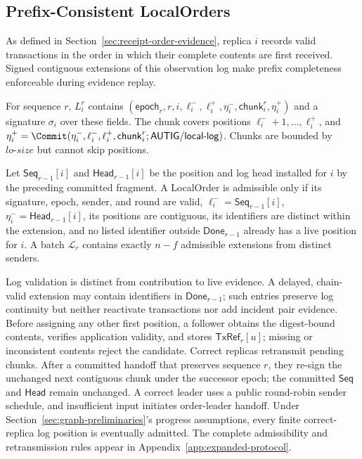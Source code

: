 \subsection{Prefix-Consistent LocalOrders}
\label{sec:prefix-consistent-localorders}

As defined in Section~\ref{sec:receipt-order-evidence}, replica $i$ records
valid transactions in the order in which their complete contents are first
received.  Signed contiguous extensions of this observation log make prefix
completeness enforceable during evidence replay.

For sequence $r$, $L_i^r$ contains
$(\mathsf{epoch}_r,r,i,\ell_i^{-},\ell_i^{+},\eta_i^{-},
\mathsf{chunk}_i^r,\eta_i^{+})$ and a signature $\sigma_i$ over these fields.
The chunk covers positions $\ell_i^{-}+1,\ldots,\ell_i^{+}$, and
$\eta_i^{+}=\Commit(\eta_i^{-},\ell_i^{-},\ell_i^{+},
\mathsf{chunk}_i^r;\mathsf{AUTIG/local\mbox{-}log})$.
Chunks are bounded by $lo\text{-}size$ but cannot skip positions.

Let $\mathsf{Seq}_{r-1}[i]$ and $\mathsf{Head}_{r-1}[i]$ be the position and
log head installed for $i$ by the preceding committed fragment.
A LocalOrder is admissible only if its signature, epoch, sender, and round are
valid,
$\ell_i^{-}=\mathsf{Seq}_{r-1}[i]$,
$\eta_i^{-}=\mathsf{Head}_{r-1}[i]$, its positions are contiguous, its
identifiers are distinct within the extension, and no listed identifier
outside $\mathsf{Done}_{r-1}$ already has a live position for $i$.  A batch
$\mathcal L_r$ contains exactly $n-f$ admissible extensions from distinct
senders.

Log validation is distinct from contribution to live evidence.  A delayed,
chain-valid extension may contain identifiers in $\mathsf{Done}_{r-1}$; such
entries preserve log continuity but neither reactivate transactions nor add
incident pair evidence.  Before assigning any other first position, a follower
obtains the digest-bound contents, verifies application validity, and stores
$\mathsf{TxRef}_r[u]$; missing or inconsistent contents reject the candidate.
Correct replicas retransmit pending chunks.  After a committed handoff that
preserves sequence $r$, they re-sign the unchanged next contiguous chunk under
the successor epoch; the committed $\mathsf{Seq}$ and $\mathsf{Head}$ remain
unchanged.  A correct leader uses a public round-robin sender schedule, and
insufficient input initiates order-leader handoff.  Under
Section~\ref{sec:graph-preliminaries}'s progress assumptions,
every finite correct-replica log position is eventually admitted.  The complete
admissibility and retransmission rules appear in
Appendix~\ref{app:expanded-protocol}.

